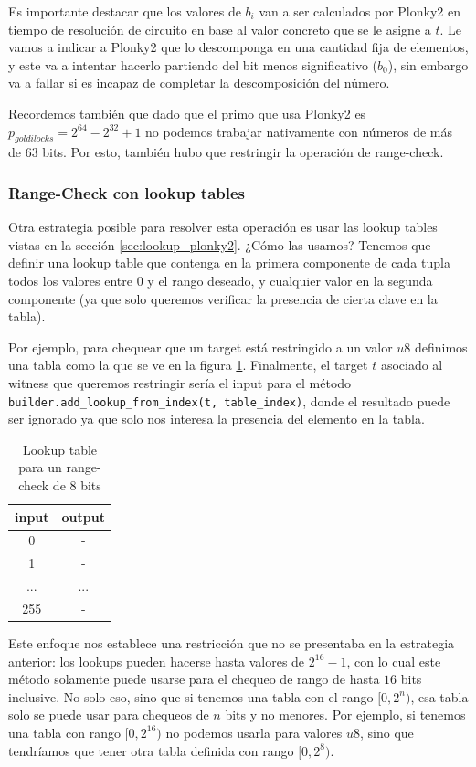 Es importante destacar que los valores de $b_i$ van a ser calculados por Plonky2 en tiempo de resolución de circuito en base al valor concreto que se le asigne a $t$. Le vamos a indicar a Plonky2 que lo descomponga en una cantidad fija de elementos, y este va a intentar hacerlo partiendo del bit menos significativo ($b_0$), sin embargo va a fallar si es incapaz de completar la descomposición del número. 

Recordemos también que dado que el primo que usa Plonky2 es $p_{goldilocks} = 2^{64} - 2^{32} + 1$ no podemos trabajar nativamente con números de más de $63$ bits. Por esto, también hubo que restringir la operación de range-check. 

\subsubsection{\textbf{Range-Check con lookup tables}}
Otra estrategia posible para resolver esta operación es usar las lookup tables vistas en la sección \ref{sec:lookup_plonky2}. ¿Cómo las usamos? Tenemos que definir una lookup table que contenga en la primera componente de cada tupla todos los valores entre $0$ y el rango deseado, y cualquier valor en la segunda componente (ya que solo queremos verificar la presencia de cierta clave en la tabla).

Por ejemplo, para chequear que un target está restringido a un valor $u8$ definimos una tabla como la que se ve en la figura \ref{tab:tabla_lookup_u8}. Finalmente, el target $t$ asociado al witness que queremos restringir sería el input para el método \texttt{builder.add\_lookup\_from\_index(t, table\_index)}, donde el resultado puede ser ignorado ya que solo nos interesa la presencia del elemento en la tabla. 

\begin{table}
\begin{center}
\begin{tabular}{cc}
\toprule
input & output \\
\midrule
0 & - \\
1 & - \\
... & ... \\
255 & - \\
\bottomrule
\end{tabular}
\caption{Lookup table para un range-check de 8 bits}
\label{tab:tabla_lookup_u8}
\end{center}
\end{table}

Este enfoque nos establece una restricción que no se presentaba en la estrategia anterior: los lookups pueden hacerse hasta valores de $2^{16} -1$, con lo cual este método solamente puede usarse para el chequeo de rango de hasta $16$ bits inclusive. No solo eso, sino que si tenemos una tabla con el rango $[0, 2^n)$, esa tabla solo se puede usar para chequeos de $n$ bits y no menores. Por ejemplo, si tenemos una tabla con rango $[0,2^{16})$ no podemos usarla para valores $u8$, sino que tendríamos que tener otra tabla definida con rango $[0, 2^8)$.

